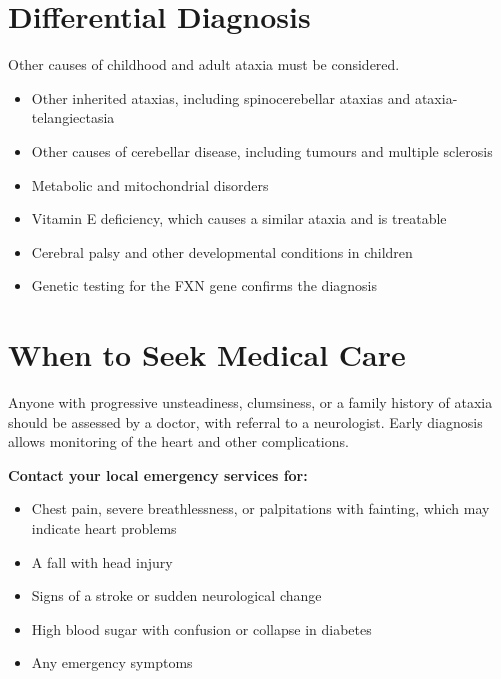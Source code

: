 \section*{Differential Diagnosis}
Other causes of childhood and adult ataxia must be considered.
\begin{itemize}
    \item Other inherited ataxias, including spinocerebellar ataxias and ataxia-telangiectasia
    \item Other causes of cerebellar disease, including tumours and multiple sclerosis
    \item Metabolic and mitochondrial disorders
    \item Vitamin E deficiency, which causes a similar ataxia and is treatable
    \item Cerebral palsy and other developmental conditions in children
    \item Genetic testing for the FXN gene confirms the diagnosis
\end{itemize}

\section*{When to Seek Medical Care}
Anyone with progressive unsteadiness, clumsiness, or a family history of ataxia should be assessed by a doctor, with referral to a neurologist. Early diagnosis allows monitoring of the heart and other complications.

\textbf{Contact your local emergency services for:}
\begin{itemize}
    \item Chest pain, severe breathlessness, or palpitations with fainting, which may indicate heart problems
    \item A fall with head injury
    \item Signs of a stroke or sudden neurological change
    \item High blood sugar with confusion or collapse in diabetes
    \item Any emergency symptoms
\end{itemize}

